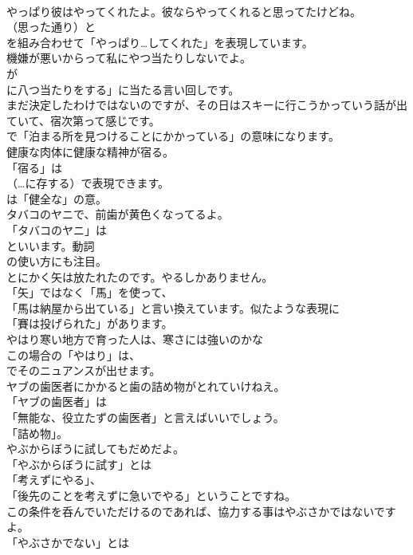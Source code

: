 \documentclass[8pt]{extreport}
\begin{document}
\begin{CJK}{UTF8}{min}
\\	やっぱり彼はやってくれたよ。彼ならやってくれると思ってたけどね。 
\\	（思った通り）と 
\\	を組み合わせて「やっぱり…してくれた」を表現しています。	
\\	機嫌が悪いからって私にやつ当たりしないでよ。 
\\	が
\\	に八つ当たりをする」に当たる言い回しです。	
\\	まだ決定したわけではないのですが、その日はスキーに行こうかっていう話が出ていて、宿次第って感じです。 
\\	で「泊まる所を見つけることにかかっている」の意味になります。	
\\	健康な肉体に健康な精神が宿る。 
\\	「宿る」は 
\\	（…に存する）で表現できます。
\\	は「健全な」の意。	
\\	タバコのヤニで、前歯が黄色くなってるよ。 
\\	「タバコのヤニ」は
\\	といいます。動詞
\\	の使い方にも注目。	
\\	とにかく矢は放たれたのです。やるしかありません。 
\\	「矢」ではなく「馬」を使って、
\\	「馬は納屋から出ている」と言い換えています。似たような表現に
\\	「賽は投げられた」があります。	
\\	やはり寒い地方で育った人は、寒さには強いのかな 
\\	この場合の「やはり」は、
\\	でそのニュアンスが出せます。	
\\	ヤブの歯医者にかかると歯の詰め物がとれていけねえ。 
\\	「ヤブの歯医者」は
\\	「無能な、役立たずの歯医者」と言えばいいでしょう。
\\	「詰め物」。	
\\	やぶからぼうに試してもだめだよ。 
\\	「やぶからぼうに試す」とは
\\	「考えずにやる」、
\\	「後先のことを考えずに急いでやる」ということですね。	
\\	この条件を呑んでいただけるのであれば、協力する事はやぶさかではないですよ。 
\\	「やぶさかでない」とは

\end{CJK}
\end{document}
